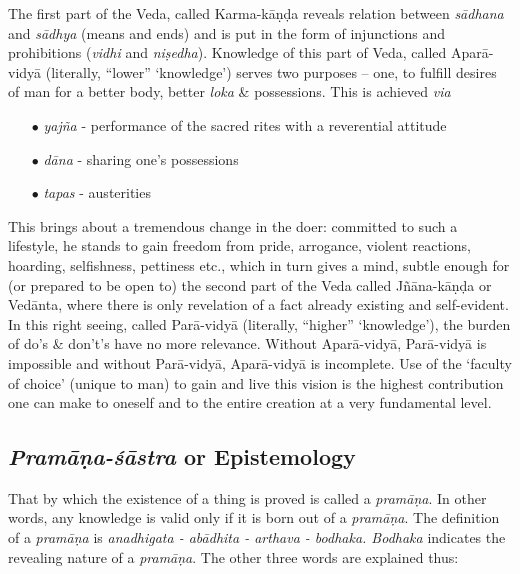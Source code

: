 The first part of the Veda, called Karma-kāṇḍa reveals relation between  {\sl sādhana} and {\sl sādhya} (means and ends) and is put in the form of injunctions and prohibitions ({\sl vidhi} and {\sl niṣedha}). Knowledge of this part of Veda, called Aparā-vidyā (literally, ``lower'' `knowledge') serves two purposes -- one, to fulﬁll desires of man for a better body, better {\sl loka} \& possessions. This is achieved {\sl via}
\begin{itemize}
\itemsep=0pt
\item[$\bullet$] {\sl yajña} - performance of the sacred rites with a reverential attitude 
\item[$\bullet$] {\sl dāna} - sharing one's possessions
\item[$\bullet$] {\sl tapas} - austerities 
\end{itemize}
This brings about a tremendous change in the doer: committed to such a lifestyle, he stands to gain freedom from pride, arrogance, violent reactions, hoarding, selﬁshness, pettiness etc., which in turn gives a mind, subtle enough for (or prepared to be open to) the second part of the Veda called Jñāna-kāṇḍa or Vedānta, where there is only revelation of a fact already existing and self-evident. In this right seeing, called Parā-vidyā  (literally, ``higher'' `knowledge'), the burden of do’s \& don't's have no more relevance. Without Aparā-vidyā, Parā-vidyā is impossible and without Parā-vidyā, Aparā-vidyā is incomplete. Use of the `faculty of choice' (unique to man) to gain and live this vision is the highest contribution one can make to oneself and to the entire creation at a very fundamental level.\\[-20pt]

\subsection{{{\sl\bfseries Pramāṇa-śāstra}\relax} or Epistemology}\label{art12-sec2.2}

That by which the existence of a thing is proved is called a {\sl pramāṇa}. In other words, any knowledge is valid only if it is born out of a {\sl pramāṇa}. The deﬁnition of a {\sl pramāṇa}  is {\sl anadhigata - abādhita - arthava - bodhaka. Bodhaka} indicates the revealing nature of a {\sl pramāṇa}. The other three words are explained thus:

